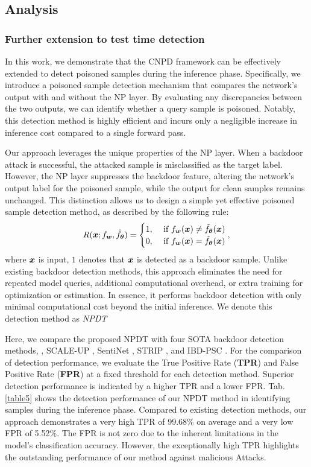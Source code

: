 \subsection{Analysis\label{sec4.4}}

\subsubsection{Further extension to test time detection}
In this work, we demonstrate that the CNPD framework can be effectively extended to detect poisoned samples during the inference phase. 
Specifically, we introduce a poisoned sample detection mechanism that compares the network's output with and without the NP layer. By evaluating any discrepancies between the two outputs, we can identify whether a query sample is poisoned. Notably, this detection method is highly efficient and incurs only a negligible increase in inference cost compared to a single forward pass.

Our approach leverages the unique properties of the NP layer. When a backdoor attack is successful, the attacked sample is misclassified as the target label. However, the NP layer suppresses the backdoor feature, altering the network's output label for the poisoned sample, while the output for clean samples remains unchanged. This distinction allows us to design a simple yet effective poisoned sample detection method, as described by the following rule:
\begin{equation}
    R(\bm{x};f_{\bm{w}},\hat{f}_{\bm{\theta}})= \begin{cases}\text {1}, & \text { if } f_{\bm{w}}(\bm{x})\neq \hat{f}_{\bm{\theta}}(\bm{x}) \\ 0 , & \text { if } f_{\bm{w}}(\bm{x})= \hat{f}_{\bm{\theta}}(\bm{x})\end{cases},
\end{equation}
where $\bm{x}$ is input, $1$ denotes that $\bm{x}$ is detected as a backdoor sample.
Unlike existing backdoor detection methods, this approach eliminates the need for repeated model queries, additional computational overhead, or extra training for optimization or estimation. In essence, it performs backdoor detection with only minimal computational cost beyond the initial inference. We denote this detection method as \textit{NPDT}

Here, we compare the proposed NPDT with four SOTA backdoor detection methods, \ie, 
SCALE-UP \cite{guoscale}, SentiNet \cite{chou2020sentinet}, STRIP \cite{gao2019strip}, and IBD-PSC \cite{hou2024ibdpsc}.
 For the comparison of detection performance, we evaluate the True Positive Rate (\textbf{TPR}) and False Positive Rate (\textbf{FPR}) at a fixed threshold for each detection method. Superior detection performance is indicated by a higher TPR and a lower FPR.
Tab. \ref{table5} shows the detection performance of our NPDT method in identifying samples during the inference phase. Compared to existing detection methods, our approach demonstrates a very high TPR of 99.68\% on average and a very low FPR of 5.52\%. The FPR is not zero due to the inherent limitations in the model’s classification accuracy. However, the exceptionally high TPR highlights the outstanding performance of our method against malicious Attacks.

